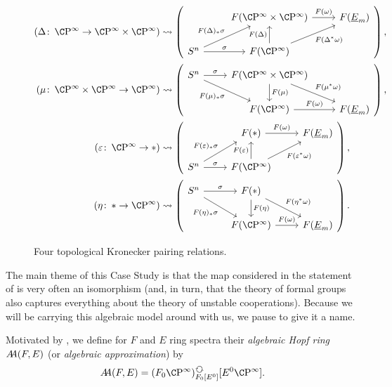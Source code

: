 \begin{figure}
\begin{align*}
(\Delta\co \CP^\infty \to \CP^\infty \times \CP^\infty) & \leadsto
\left(
\begin{tikzcd}[ampersand replacement=\&]
\& F(\CP^\infty \times \CP^\infty) \arrow["F(\omega)"]{r} \& F(\OS{E}{m}) \\
S^n \arrow["\sigma"]{r} \arrow["F(\Delta)_* \sigma"]{ru} \& F(\CP^\infty) \arrow["F(\Delta)"]{u} \arrow["F(\Delta^* \omega)"']{ru}
\end{tikzcd}
\right), \\
(\mu\co \CP^\infty \times \CP^\infty \to \CP^\infty) & \leadsto
\left(
\begin{tikzcd}[ampersand replacement=\&]
S^n \arrow["\sigma"]{r} \arrow["F(\mu)_* \sigma"']{rd} \& F(\CP^\infty \times \CP^\infty) \arrow["F(\mu)"]{d} \arrow["F(\mu^* \omega)"]{rd} \\
\& F(\CP^\infty) \arrow["F(\omega)"]{r} \& F(\OS{E}{m})
\end{tikzcd}
\right), \\
(\eps\co \CP^\infty \to *) & \leadsto
\left(
\begin{tikzcd}[ampersand replacement=\&]
\& F(*) \arrow["F(\omega)"]{r} \& F(\OS{E}{m}) \\
S^n \arrow["\sigma"]{r} \arrow["F(\eps)_* \sigma"]{ru} \& F(\CP^\infty) \arrow["F(\eps)"]{u} \arrow["F(\eps^* \omega)"']{ru}
\end{tikzcd}
\right), \\
(\eta\co * \to \CP^\infty) & \leadsto
\left(
\begin{tikzcd}[ampersand replacement=\&]
S^n \arrow["\sigma"]{r} \arrow["F(\eta)_* \sigma"']{rd} \& F(*) \arrow["F(\eta)"]{d} \arrow["F(\eta^* \omega)"]{rd} \\
\& F(\CP^\infty) \arrow["F(\omega)"]{r} \& F(\OS{E}{m})
\end{tikzcd}
\right).
\end{align*}
\caption{Four topological Kronecker pairing relations.}\label{KroneckerPairingFigure}
\end{figure}

The main theme of this Case Study is that the map considered in the statement of  is very often an isomorphism (and, in turn, that the theory of formal groups also captures everything about the theory of unstable cooperations).
Because we will be carrying this algebraic model around with us, we pause to give it a name.

\begin{definition}
Motivated by , we define for \(F\) and \(E\) ring spectra their \textit{algebraic Hopf ring} \(\AA(F, E)\) (or \textit{algebraic approximation}) by \[\AA(F, E) = (F_0 \CP^\infty)_{F_0[E^0]}^{\circulatearrows}[E^0 \CP^\infty].\]
\end{definition}

